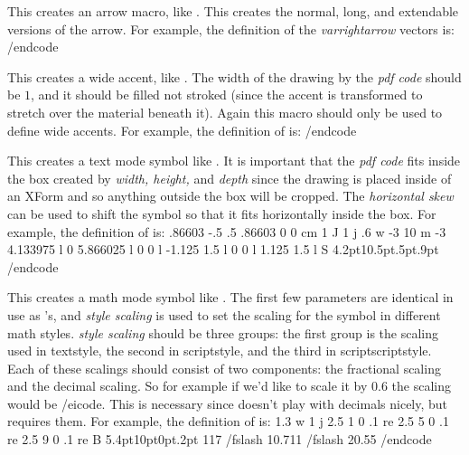  This creates an arrow macro, like \macroname\varrightarrow.
This creates the normal, long, and extendable versions of the arrow.
For example, the definition of the {\it varrightarrow} vectors is:
\begincode
{}\@linecap\@rarrow
/endcode
\emacroexp

 This creates a wide accent, like \macroname\varwidecheck.
The width of the drawing by the {\it pdf code} should be $1$, and it should be filled not stroked (since the accent is
transformed to stretch over the material beneath it).
Again this macro should only be used to define wide accents.
For example, the definition of \macroname\varwidecheck{} is:
\begincode
\def\varwidecheck{\@wide@accent{0 1.3 m .5 -.4 l 1 1.3 l 1 1.6 l .5 .3 l 0 1.6 l f}}
/endcode
\emacroexp

 This creates a text mode
symbol like \macroname\lightning.
It is important that the {\it pdf code} fits inside the box created by {\it width, height,\/} and {\it depth} since the
drawing is placed inside of an XForm and so anything outside the box will be cropped.
The {\it horizontal skew} can be used to shift the symbol so that it fits horizontally inside the box.
For example, the definition of \macroname\lightning{} is:
\begincode
{}       %
    {.86603 -.5 .5 .86603 0 0 cm    %
    1 J 1 j .6 w
    -3 10 m -3 4.133975 l 0 5.866025 l 0 0 l -1.125 1.5 l 0 0 l 1.125 1.5 l S}
    {4.2pt}{10.5pt}{.5pt}{.9pt}
/endcode
\emacroexp

 This creates a math
mode symbol like \macroname\divs.
The first few parameters are identical in use as \macroname\pdf@drawing@macro's, and {\it style scaling} is used to set the
scaling for the symbol in different math styles.
{\it style scaling} should be three groups: the first group is the scaling used in textstyle, the second in scriptstyle, and
the third in scriptscriptstyle.
Each of these scalings should consist of two components: the fractional scaling and the decimal scaling.
So for example if we'd like to scale it by $0.6$ the scaling would be /eicode.
This is necessary since \macroname\dimexpr{} doesn't play with decimals nicely, but \macroname\pdfliteral{} requires them.
For example, the definition of \macroname\divs{} is:
\begincode
{}
    {1.3 w 1 j
    2.5 1 0 .1 re
    2.5 5 0 .1 re
    2.5 9 0 .1 re B}
    {5.4pt}{10pt}{0pt}{.2pt}
    {{1}{1}}{{7 /fslash 10}{.7}}{{11 /fslash 20}{.55}}
\def\divs{\mathrel{\@divs}}     %
/endcode
\emacroexp

